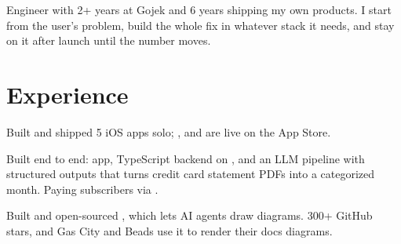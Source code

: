 \documentclass{fonts}
\begin{document}
%
%


\section{}
\vspace{-17pt}
\raggedright
{}

\vspace{2pt}
{\color{primary}\fontsize{10pt}{12pt}\selectfont
Engineer with 2+ years at Gojek and 6 years shipping my own products. I start from the user's problem, build the whole fix in whatever stack it needs, and stay on it after launch until the number moves.}


\section{Experience}
\textbf{}
\begin{tightemize}
    \item Built and shipped 5 iOS apps solo; ,  and  are live on the App Store.
    \item Built \underline{\href{https://apps.apple.com/us/app/ai-spend-tracker-retrobudget/id6743363764}{}} end to end:  app, TypeScript backend on , and an LLM pipeline with structured outputs that turns credit card statement PDFs into a categorized month. Paying subscribers via .
    \item Built and open-sourced \underline{\href{https://github.com/swiftlysingh/excalidraw-cli}{}}, which lets AI agents draw diagrams. 300+ GitHub stars, and Gas City and Beads use it to render their docs diagrams.
\end{tightemize}
\end{document}
